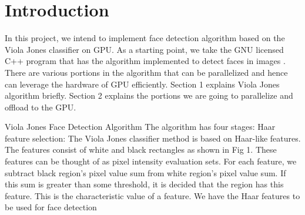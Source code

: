 \section{Introduction}\label{sec: intro}


In this project, we intend to implement face detection algorithm based on the Viola Jones classifier  on GPU. 
As a starting point, we take the GNU licensed C++ program that has the 
algorithm implemented to detect faces in images . 
There are various portions in the algorithm that can be parallelized and hence can leverage the hardware of GPU efficiently. 
Section 1 explains Viola Jones algorithm briefly. Section 2 explains the portions we are going to parallelize and offload to the GPU.


Viola Jones Face Detection Algorithm
The algorithm has four stages:
Haar feature selection: The Viola Jones classifier method is based on Haar-like features. 
The features consist of white and black rectangles as shown in Fig 1. 
These features can be thought of as pixel intensity evaluation sets. 
For each feature, we subtract black region’s pixel value sum from white region’s pixel value sum. 
If this sum is greater than some threshold, it is decided that the region has this feature. 
This is the characteristic value of a feature. We have the Haar features
to be used for face detection

